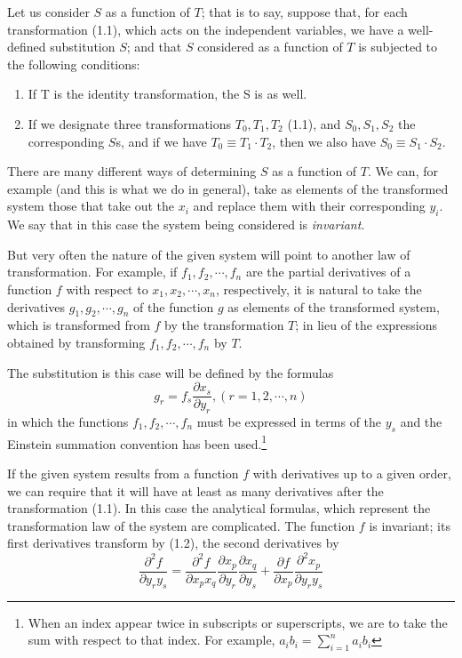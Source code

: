 \documentclass{book}
\begin{document}
Let us consider $S$ as a function of $T$; that is to say, suppose that, for each transformation (1.1), which acts on the independent variables, we have a well-defined substitution $S$; and that $S$ considered as a function of $T$ is subjected to the following conditions:
\begin{enumerate}
	\item
	If T is the identity transformation, the S is as well.
	\item
	If we designate three transformations $T_0,T_1,T_2$ (1.1), and $S_0,S_1,S_2$ the corresponding $S$s, and if we have $T_0\equiv T_1\cdot T_2$, then we also have $S_0\equiv S_1\cdot S_2$.
\end{enumerate}
There are many different ways of determining $S$ as a function of $T$. We can, for example (and this is what we do in general), take as elements of the transformed system those that take out the $x_i$ and replace them with their corresponding $y_i$. We say that in this case the system being considered is \emph{invariant}.

But very often the nature of the given system will point to another law of transformation. For example, if $f_1,f_2,\cdots,f_n$ are the partial derivatives of a function $f$ with respect to $x_1,x_2,\cdots,x_n$, respectively, it is natural to take the derivatives $g_1,g_2,\cdots,g_n$ of the function $g$ as elements of the transformed system, which is transformed from $f$ by the transformation $T$; in lieu of the expressions obtained by transforming $f_1,f_2,\cdots,f_n$ by $T$.

The substitution is this case will be defined by the formulas
\begin{equation}
g_r=f_s\frac{\partial x_s}{\partial y_r}, (r=1,2,\cdots,n)
\end{equation}
in which the functions $f_1,f_2,\cdots,f_n$ must be expressed in terms of the $y_s$ and the Einstein summation convention has been used.\footnote{When an index appear twice in subscripts or superscripts, we are to take the sum with respect to that index. For example, $\displaystyle a_ib_i=\sum_{i=1}^n{a_ib_i}$}

If the given system results from a function $f$ with derivatives up to a given order, we can require that it will have at least as many derivatives after the transformation (1.1). In this case the analytical formulas, which represent the transformation law of the system are complicated. The function $f$ is invariant; its first derivatives transform by (1.2), the second derivatives by
\begin{equation}
\frac{\partial^2f}{\partial y_ry_s}=\frac{\partial^2f}{\partial x_px_q}\frac{\partial x_p}{\partial y_r}\frac{\partial x_q}{\partial y_s}+\frac{\partial f}{\partial x_p}\frac{\partial^2x_p}{\partial y_ry_s}
\end{equation}
\end{document}
